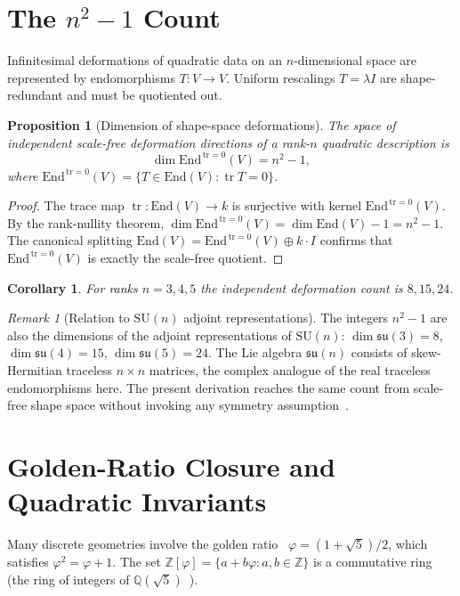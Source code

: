 \documentclass[12pt]{article}
\newtheorem{proposition}[theorem]{Proposition}
\newtheorem{corollary}[theorem]{Corollary}
\theoremstyle{definition}
\theoremstyle{remark}
\newtheorem{remark}[theorem]{Remark}
\newcommand{\Z}{\mathbb{Z}}
\newcommand{\Q}{\mathbb{Q}}
\newcommand{\End}{\mathrm{End}}
\newcommand{\Endzero}{\mathrm{End}^{\,\mathrm{tr}=0}}
\begin{document}
\section{The $n^2-1$ Count}

Infinitesimal deformations of quadratic data on an $n$-dimensional space
are represented by endomorphisms $T\colon V\to V$. Uniform rescalings
$T=\lambda I$ are shape-redundant and must be quotiented out.

\begin{proposition}[Dimension of shape-space deformations]
\label{prop:dim}
The space of independent scale-free deformation directions of a rank-$n$
quadratic description is
\[
\dim\Endzero(V)=n^2-1,
\]
where $\Endzero(V)=\{T\in\End(V):\operatorname{tr}T=0\}$.
\end{proposition}

\begin{proof}
The trace map $\operatorname{tr}\colon\End(V)\to k$ is surjective with
kernel $\Endzero(V)$. By the rank-nullity theorem,
$\dim\Endzero(V)=\dim\End(V)-1=n^2-1$.
The canonical splitting $\End(V)=\Endzero(V)\oplus k\cdot I$ confirms
that $\Endzero(V)$ is exactly the scale-free quotient.
\end{proof}

\begin{corollary}
For ranks $n=3,4,5$ the independent deformation count is $8,15,24$.
\end{corollary}

\begin{remark}[Relation to $\mathrm{SU}(n)$ adjoint representations]
\label{rem:sun}
The integers $n^2-1$ are also the dimensions of the adjoint representations
of $\mathrm{SU}(n)$: $\dim\mathfrak{su}(3)=8$, $\dim\mathfrak{su}(4)=15$,
$\dim\mathfrak{su}(5)=24$. The Lie algebra $\mathfrak{su}(n)$ consists of
skew-Hermitian traceless $n\times n$ matrices, the complex analogue of the
real traceless endomorphisms here. The present derivation reaches the same
count from scale-free shape space without invoking any symmetry assumption~\cite{ratcliffe,weyl}.
\end{remark}

\section{Golden-Ratio Closure and Quadratic Invariants}

Many discrete geometries involve the golden ratio~\cite{coxeter} $\varphi=(1+\sqrt5)/2$,
which satisfies $\varphi^2=\varphi+1$. The set
$\Z[\varphi]=\{a+b\varphi:a,b\in\Z\}$ is a commutative ring (the ring
of integers of $\Q(\sqrt5)$~\cite{neukirch}).
\end{document}
